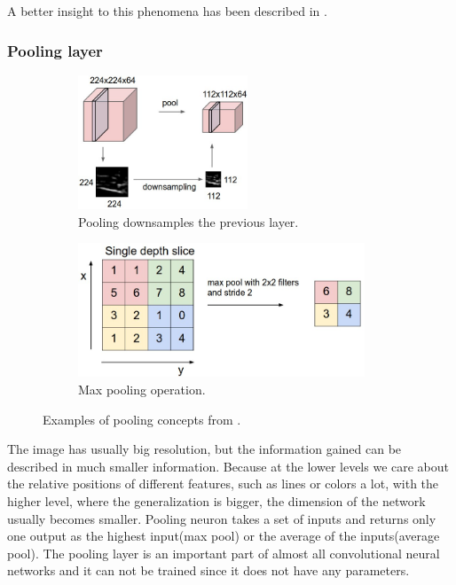 \documentclass[a4paper,12pt,titlepage]{article}
\numberwithin{figure}{section}
\begin{document}
A better insight to this phenomena has been described in \cite{zeiler2014visualizing}.

\subsubsection{Pooling layer}
\begin{figure}
    \begin{subfigure}[Sample1]{0.5\linewidth}
    	\includegraphics[height=40mm]{fig/pool1.jpeg} 
        \caption{Pooling downsamples the previous layer.}
        \label{fig:conv_layer}
    \end{subfigure}
    \begin{subfigure}[Sample1]{0.5\linewidth} 
    	\includegraphics[height=40mm]{fig/pool2.jpeg}
        \caption{Max pooling operation.}   
        \label{fig:neuron}
    \end{subfigure} 
    \caption{Examples of pooling concepts from \cite{karpathy2016cs231n}.}
\end{figure}

The image has usually big resolution, but the information gained can be described in much smaller information. Because at the lower levels we care about the relative positions of different features, such as lines or colors a lot, with the higher level, where the generalization is bigger, the dimension of the network usually becomes smaller. Pooling neuron takes a set of inputs and returns only one output as the highest input(max pool) or the average of the inputs(average pool). The pooling layer\cite{scherer2010evaluation} is an important part of almost all convolutional neural networks and it can not be trained since it does not have any parameters.
\end{document}
